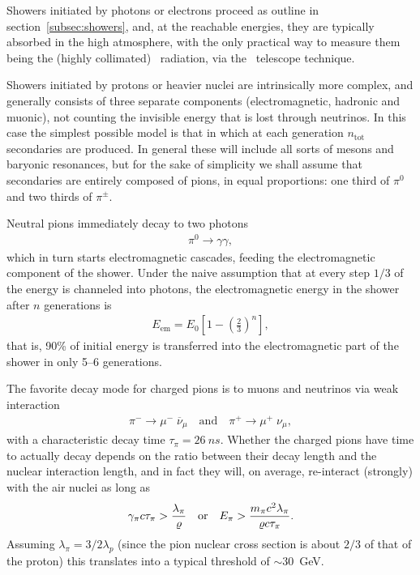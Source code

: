 Showers initiated by photons or electrons proceed as outline in section~\ref{subsec:showers},
and, at the reachable energies, they are typically absorbed in the high atmosphere,
with the only practical way to measure them being the (highly collimated)
\cherenkov~radiation, via the \cherenkov~telescope technique.

Showers initiated by protons or heavier nuclei are intrinsically more complex,
and generally consists of three separate components (electromagnetic, hadronic
and muonic), not counting the invisible energy that is lost through neutrinos.
In this case the simplest possible model is that in which at each generation
$n_\text{tot}$ secondaries
are produced. In general these will include all sorts
of mesons and baryonic resonances, but for the sake of simplicity we shall assume
that secondaries are entirely composed of pions, in equal proportions: one third
of $\pi^0$ and two thirds of $\pi^\pm$.

Neutral pions immediately decay to two photons
\begin{align*}
  \pi^0 \rightarrow \gamma \gamma,
\end{align*}
which in turn starts electromagnetic cascades, feeding the electromagnetic component
of the shower. Under the naive assumption that at every step $1/3$ of the energy
is channeled into photons, the electromagnetic energy in the shower after $n$
generations is
\begin{align}
  E_\text{em} = E_0 \left[ 1 - \left( \frac{2}{3} \right)^n \right],
\end{align}
that is, 90\% of initial energy is transferred into the electromagnetic part of the
shower in only 5--6 generations.

The favorite decay mode for charged pions is to muons and neutrinos via weak interaction
\begin{align*}
  \pi^- \rightarrow \mu^- \; \overline{\nu}_\mu
  \quad\text{and}\quad
  \pi^+ \rightarrow \mu^+ \; \nu_\mu,
\end{align*}
with a characteristic decay time $\tau_\pi = 26~ns$. Whether the charged pions
have time to actually decay depends on the ratio between their decay length and
the nuclear interaction length, and in fact they will, on average, re-interact
(strongly) with the air nuclei as long as
\begin{align*}
  \gamma_\pi c \tau_\pi > \frac{\lambda_\pi}{\varrho}
  \quad\text{or}\quad
  E_\pi > \frac{m_\pi c^2 \lambda_\pi}{\varrho c\tau_\pi}.
\end{align*}
Assuming $\lambda_\pi = 3/2 \lambda_p$ (since the pion nuclear cross section is
about $2/3$ of that of the proton) this translates into a typical threshold of
$\sim 30$~GeV.

